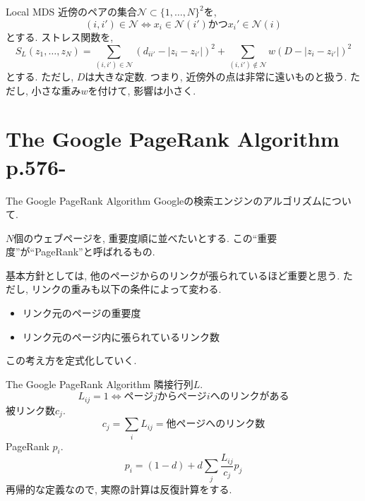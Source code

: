 \documentclass[dvipdfmx,8pt]{beamer}
\begin{document}
  \begin{frame}{Local MDS}
    近傍のペアの集合$\mathcal{N}\subset \{1,\dots,N\}^2$を,
    \[
      (i,i')\in\mathcal{N}\Leftrightarrow x_i\in \mathcal{N}(i')\mbox{かつ}x_i'\in \mathcal{N}(i)
    \]
    とする. ストレス関数を,
    \[
      S_L(z_1,\dots,z_N)=\sum_{(i,i')\in\mathcal{N}}(d_{ii'}-|z_i-z_{i'}|)^2+\sum_{(i,i')\notin\mathcal{N}}w(D-|z_i-z_{i'}|)^2
    \]
    とする. ただし, $D$は大きな定数. つまり, 近傍外の点は非常に遠いものと扱う.
    ただし, 小さな重み$w$を付けて, 影響は小さく.
  \end{frame}
  \section{The Google PageRank Algorithm\\p.576-}
  \begin{frame}{The Google PageRank Algorithm}
    Googleの検索エンジンのアルゴリズムについて.

    $N$個のウェブページを, 重要度順に並べたいとする.
    この``重要度''が``PageRank''と呼ばれるもの.

    基本方針としては, 他のページからのリンクが張られているほど重要と思う.
    ただし, リンクの重みも以下の条件によって変わる.
    \begin{itemize}
      \item リンク元のページの重要度
      \item リンク元のページ内に張られているリンク数
    \end{itemize}

    この考え方を定式化していく.

  \end{frame}
  \begin{frame}{The Google PageRank Algorithm}
    隣接行列$L$.
    \[
      L_{ij}=1 \Leftrightarrow \mbox{ページ}j\mbox{からページ}i\mbox{へのリンクがある}
    \]
    被リンク数$c_j$.
    \[
      c_j=\sum_iL_{ij}=\mbox{他ページへのリンク数}
    \]
    PageRank $p_i$.
    \[
      p_i=(1-d)+d\sum_j\frac{L_{ij}}{c_j}p_j
    \]
    再帰的な定義なので, 実際の計算は反復計算をする.
  \end{frame}
\end{document}
